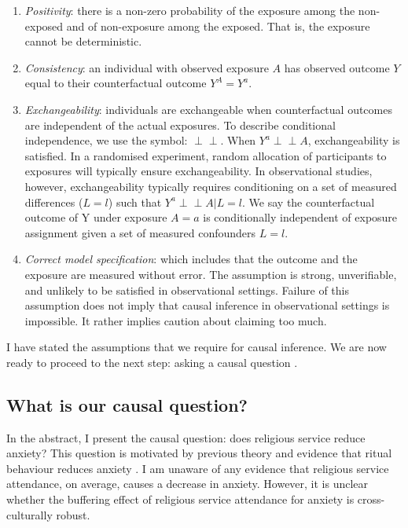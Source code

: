 \documentclass[]{interact}
\theoremstyle{plain}%
\theoremstyle{definition}
\theoremstyle{remark}
\newcommand{\indep}{\perp \!\!\! \perp}
\begin{document}
\begin{enumerate}
    \item {\it Positivity}: there is a non-zero probability of the exposure among the non-exposed and of non-exposure among the exposed. That is, the exposure cannot be deterministic. 
    \item {\it Consistency}: an individual with observed exposure $A$ has observed outcome $Y$ equal to their counterfactual outcome $Y^{A}=Y^a$.
    \item {\it Exchangeability}: individuals are exchangeable when counterfactual outcomes are independent of the actual exposures. To describe conditional independence, we use the symbol: $\indep$. When  $Y^a\indep A$,  exchangeability is satisfied. In a randomised experiment, random allocation of participants to exposures will typically ensure exchangeability. In observational studies, however, exchangeability typically requires conditioning on a set of measured differences ($L=l$) such that $Y^a\indep A|L=l$. We say the counterfactual outcome of Y under exposure $A=a$ is conditionally independent of exposure assignment given a set of measured confounders $L=l$.
    \item {\it Correct model specification}: which includes that the outcome and the exposure are measured without error. The assumption is strong, unverifiable, and unlikely to be satisfied in observational settings. Failure of this assumption does not imply that causal inference in observational settings is impossible. It rather implies caution about claiming too much.
\end{enumerate}

I have stated the assumptions that we require for causal inference. We are now ready to proceed to the next step: asking a causal question \citep[for introductions to the key concepts in causal inference, see:][]{gelman_arm_2020, hernan_causal_2020,vanderweele_explanation_2015}.

\subsection{What is our causal question?}

In the abstract, I present the causal question: does religious service reduce anxiety? This question is motivated by previous theory and evidence that ritual behaviour reduces anxiety \citep[see:][]{malinowski_magic_2014,sosis_psalms_2007,lang_effects_2015, ejova_church_2020}. 
I am unaware of any evidence that religious service attendance, on average, causes a decrease in anxiety. However, it is unclear whether the buffering effect of religious service attendance for anxiety is cross-culturally robust.
\end{document}
